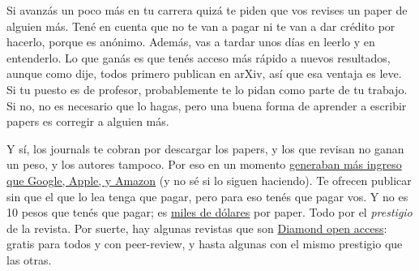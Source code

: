 \documentclass{article}
\begin{document}
Si avanzás un poco más en tu carrera quizá te piden que vos revises un paper de alguien más. Tené en cuenta que no te van a pagar ni te van a dar crédito por hacerlo, porque es anónimo. Además, vas a tardar unos días en leerlo y en entenderlo. Lo que ganás es que tenés acceso más rápido a nuevos resultados, aunque como dije, todos primero publican en arXiv, así que esa ventaja es leve. Si tu puesto es de profesor, probablemente te lo pidan como parte de tu trabajo. Si no, no es necesario que lo hagas, pero una buena forma de aprender a escribir papers es corregir a alguien más.

Y sí, los journals te cobran por descargar los papers, y los que revisan no ganan un peso, y los autores tampoco. Por eso en un momento \href{https://www.theguardian.com/science/2017/jun/27/profitable-business-scientific-publishing-bad-for-science}{generaban más ingreso que Google, Apple, y Amazon} (y no sé si lo siguen haciendo). Te ofrecen publicar sin que el que lo lea tenga que pagar, pero para eso tenés que pagar vos. Y no es 10 pesos que tenés que pagar; es \href{https://www.elsevier.com/about/policies-and-standards/pricing#1-publishing-charges}{miles de dólares} por paper. Todo por el \emph{prestigio} de la revista. Por suerte, hay algunas revistas que son \href{https://en.wikipedia.org/wiki/Diamond_open_access}{Diamond open access}: gratis para todos y con peer-review, y hasta algunas con el mismo prestigio que las otras.
\end{document}
